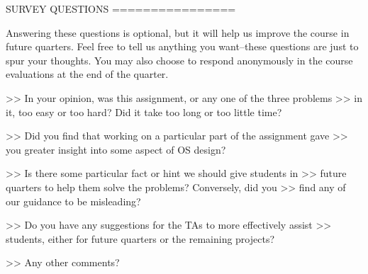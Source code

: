                SURVEY QUESTIONS
               ================

Answering these questions is optional, but it will help us improve the
course in future quarters.  Feel free to tell us anything you
want--these questions are just to spur your thoughts.  You may also
choose to respond anonymously in the course evaluations at the end of
the quarter.

>> In your opinion, was this assignment, or any one of the three problems
>> in it, too easy or too hard?  Did it take too long or too little time?

>> Did you find that working on a particular part of the assignment gave
>> you greater insight into some aspect of OS design?

>> Is there some particular fact or hint we should give students in
>> future quarters to help them solve the problems?  Conversely, did you
>> find any of our guidance to be misleading?

>> Do you have any suggestions for the TAs to more effectively assist
>> students, either for future quarters or the remaining projects?

>> Any other comments?
